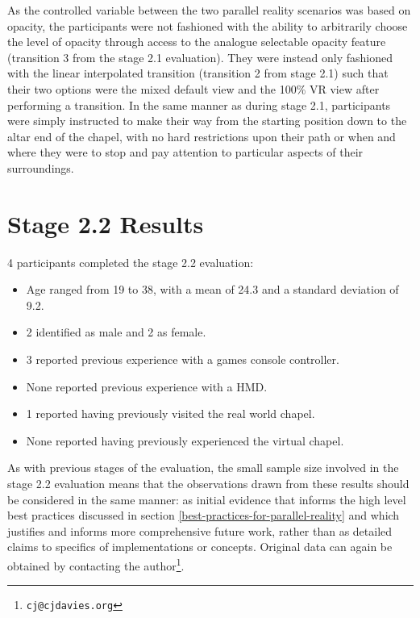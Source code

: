 As the controlled variable between the two parallel reality scenarios was based on opacity, the participants were not fashioned with the ability to arbitrarily choose the level of opacity through access to the analogue selectable opacity feature (transition 3 from the stage 2.1 evaluation). They were instead only fashioned with the linear interpolated transition (transition 2 from stage 2.1) such that their two options were the mixed default view and the 100\% VR view after performing a transition. In the same manner as during stage 2.1, participants were simply instructed to make their way from the starting position down to the altar end of the chapel, with no hard restrictions upon their path or when and where they were to stop and pay attention to particular aspects of their surroundings.


\section{Stage 2.2 Results}

4 participants completed the stage 2.2 evaluation:
\begin{itemize}
	\item Age ranged from 19 to 38, with a mean of 24.3 and a standard deviation of 9.2.
	\item 2 identified as male and 2 as female.
	\item 3 reported previous experience with a games console controller.
	\item None reported previous experience with a HMD.
	\item 1 reported having previously visited the real world chapel.
	\item None reported having previously experienced the virtual chapel.
\end{itemize}

As with previous stages of the evaluation, the small sample size involved in the stage 2.2 evaluation means that the observations drawn from these results should be considered in the same manner: as initial evidence that informs the high level best practices discussed in section \ref{best-practices-for-parallel-reality} and which justifies and informs more comprehensive future work, rather than as detailed claims to specifics of implementations or concepts. Original data can again be obtained by contacting the author\footnote{\texttt{cj@cjdavies.org}}.

